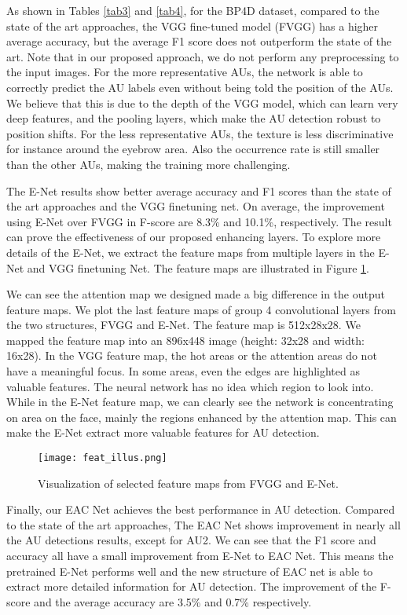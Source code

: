 \documentclass[a4paper, 10pt, conference]{ieeeconf}      %
\begin{document}
As shown in Tables \ref{tab3} and \ref{tab4}, for the BP4D dataset, compared to the state of the art approaches, the VGG fine-tuned model (FVGG) has a higher average accuracy, but the average F1 score does not outperform the state of the art. Note that in our proposed approach, we do not perform any preprocessing to the input images. For the more representative AUs, the network is able to correctly predict the AU labels even without being told the position of the AUs. We believe that this is due to the depth of the VGG model, which can learn very deep features, and the pooling layers, which make the AU detection robust to position shifts. For the less representative AUs, the texture is less discriminative for instance around the eyebrow area. Also the occurrence rate is still smaller than the other AUs, making the training more challenging. 

The E-Net results show better average accuracy and F1 scores than the state of the art approaches and the VGG finetuning net.  On average, the improvement using E-Net over FVGG in F-score are 8.3\% and 10.1\%, respectively. The result can prove the effectiveness of our proposed enhancing layers. To explore more details of the E-Net, we extract the feature maps from multiple layers in the E-Net and VGG finetuning Net. The feature maps are illustrated in Figure \ref{fig6}.

We can see the attention map we designed made a big difference in the output feature maps. We plot the last feature maps of group 4 convolutional layers from the two structures, FVGG and E-Net. The feature map is 512x28x28. We mapped the feature map into an 896x448 image (height: 32x28 and width: 16x28). In the VGG feature map, the hot areas or the attention areas do not have a meaningful focus. In some areas, even the edges are highlighted as valuable features. The neural network has no idea which region to look into. While in the E-Net feature map, we can clearly see the network is concentrating on area on the face, mainly the regions enhanced by the attention map. This can make the E-Net extract more valuable features for AU detection.  

 \begin{figure}[thpb]
      \centering
      \texttt{[image: feat\_illus.png]}
      \caption{Visualization of selected feature maps from FVGG and E-Net.}
      \label{fig6}
   \end{figure}
Finally, our EAC Net achieves the best performance in AU detection. Compared to the state of the art approaches, The EAC Net shows improvement in nearly all the AU detections results, except for AU2. We can see that the F1 score and accuracy all have a small improvement from E-Net to EAC Net. This means the pretrained E-Net performs well and the new structure of EAC net is able to extract more detailed information for AU detection. The improvement of the F-score and the average accuracy are 3.5\% and 0.7\% respectively.
\end{document}
